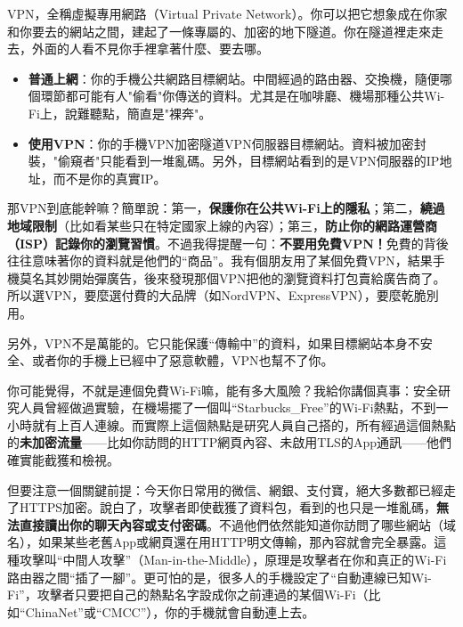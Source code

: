 


VPN，全稱虛擬專用網路（Virtual Private Network）。你可以把它想象成在你家和你要去的網站之間，建起了一條專屬的、加密的地下隧道。你在隧道裡走來走去，外面的人看不見你手裡拿著什麼、要去哪。

\begin{itemize}
  \item \textbf{普通上網}：你的手機公共網路目標網站。中間經過的路由器、交換機，隨便哪個環節都可能有人"偷看"你傳送的資料。尤其是在咖啡廳、機場那種公共Wi-Fi上，說難聽點，簡直是"裸奔"。
  \item \textbf{使用VPN}：你的手機VPN加密隧道VPN伺服器目標網站。資料被加密封裝，"偷窺者"只能看到一堆亂碼。另外，目標網站看到的是VPN伺服器的IP地址，而不是你的真實IP。
\end{itemize}

那VPN到底能幹嘛？簡單說：第一，\textbf{保護你在公共Wi-Fi上的隱私}；第二，\textbf{繞過地域限制}（比如看某些只在特定國家上線的內容）；第三，\textbf{防止你的網路運營商（ISP）記錄你的瀏覽習慣}。不過我得提醒一句：\textbf{不要用免費VPN！}免費的背後往往意味著你的資料就是他們的“商品”。我有個朋友用了某個免費VPN，結果手機莫名其妙開始彈廣告，後來發現那個VPN把他的瀏覽資料打包賣給廣告商了。所以選VPN，要麼選付費的大品牌（如NordVPN、ExpressVPN），要麼乾脆別用。

另外，VPN不是萬能的。它只能保護“傳輸中”的資料，如果目標網站本身不安全、或者你的手機上已經中了惡意軟體，VPN也幫不了你。


你可能覺得，不就是連個免費Wi-Fi嘛，能有多大風險？我給你講個真事：安全研究人員曾經做過實驗，在機場擺了一個叫“Starbucks\_Free”的Wi-Fi熱點，不到一小時就有上百人連線。而實際上這個熱點是研究人員自己搭的，所有經過這個熱點的\textbf{未加密流量}——比如你訪問的HTTP網頁內容、未啟用TLS的App通訊——他們確實能截獲和檢視。

但要注意一個關鍵前提：今天你日常用的微信、網銀、支付寶，絕大多數都已經走了HTTPS加密。說白了，攻擊者即使截獲了資料包，看到的也只是一堆亂碼，\textbf{無法直接讀出你的聊天內容或支付密碼}。不過他們依然能知道你訪問了哪些網站（域名），如果某些老舊App或網頁還在用HTTP明文傳輸，那內容就會完全暴露。這種攻擊叫“中間人攻擊”（Man-in-the-Middle），原理是攻擊者在你和真正的Wi-Fi路由器之間“插了一腳”。更可怕的是，很多人的手機設定了“自動連線已知Wi-Fi”，攻擊者只要把自己的熱點名字設成你之前連過的某個Wi-Fi（比如“ChinaNet”或“CMCC”），你的手機就會自動連上去。

